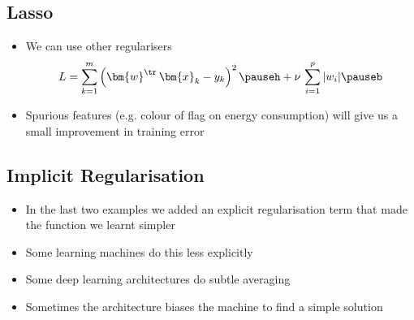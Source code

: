 
\begin{slide}
\section[-2.5]{Lasso}

\pb
\begin{itemize}\squeeze
\item We can use other regularisers
  \begin{align*}
    L = \sum_{k=1}^m \left( \bm{w}^\tr \, \bm{x}_k - y_k \right)^2\pauseh
    + \nu \, \sum_{i=1}^p |w_i| \pauseb
  \end{align*}
\item Spurious features (e.g. colour of flag on energy consumption) will
  give us a small improvement in training error\pauseh
  \begin{center}
    \pause
  \end{center}
\end{itemize}


\end{slide}


\begin{slide}
\section{Implicit Regularisation}

\begin{PauseHighLight}
  \begin{itemize}
  \item In the last two examples we added an explicit regularisation
    term that made the function we learnt simpler\pause
  \item Some learning machines do this less explicitly\pause
  \item Some deep learning architectures do subtle averaging\pause
  \item Sometimes the architecture biases the machine to find a simple
    solution\pause
  \end{itemize}
\end{PauseHighLight}

\end{slide}


